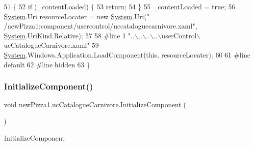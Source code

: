 \begin{DoxyCode}
51                                           \{
52             \textcolor{keywordflow}{if} (\_contentLoaded) \{
53                 \textcolor{keywordflow}{return};
54             \}
55             \_contentLoaded = \textcolor{keyword}{true};
56             \hyperlink{namespaceSystem}{System}.Uri resourceLocater = \textcolor{keyword}{new} \hyperlink{namespaceSystem}{System}.Uri(\textcolor{stringliteral}{"
      /newPizza1;component/usercontrol/uccataloguecarnivore.xaml"}, \hyperlink{namespaceSystem}{System}.UriKind.Relative);
57             
58 \textcolor{preprocessor}{            #line 1 "..\(\backslash\)..\(\backslash\)..\(\backslash\)..\(\backslash\)userControl\(\backslash\)ucCatalogueCarnivore.xaml"
}
59             \hyperlink{namespaceSystem}{System}.Windows.Application.LoadComponent(\textcolor{keyword}{this}, resourceLocater);
60             
61 \textcolor{preprocessor}{            #line default
}
62 \textcolor{preprocessor}{            #line hidden
}
63         \}
\end{DoxyCode}
\mbox{\label{classnewPizza1_1_1ucCatalogueCarnivore_ae3fbe460c9b1305f8cd5d685e12746ae}} 
\subsubsection{\texorpdfstring{Initialize\+Component()}{InitializeComponent()}\hspace{0.1cm}{\footnotesize\ttfamily [4/6]}}
{\footnotesize\ttfamily void new\+Pizza1.\+uc\+Catalogue\+Carnivore.\+Initialize\+Component (\begin{DoxyParamCaption}{ }\end{DoxyParamCaption})\hspace{0.3cm}{\ttfamily [inline]}}



Initialize\+Component 


